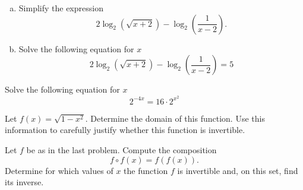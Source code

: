\documentclass[12pt]{amsart}
\begin{document}
\newpage

\begin{thm}[16 Points]\label{ex9}
  \begin{enumerate}[(a)]
  \item
    Simplify the expression 
    $$2\log_2(\sqrt{x + 2}) - \log_2\left(\frac{1}{x - 2}\right).$$
    \vspace{2in}
  \item
    Solve the following equation for $x$
    $$ 2\log_2(\sqrt{x + 2}) - \log_2\left(\frac{1}{x - 2}\right) = 5 $$
    \vspace{1in}
  \end{enumerate}
\end{thm}

\begin{thm}[16 Points]\label{ex7}
  Solve the following equation for $x$
  $$2^{-4x} = 16 \cdot 2^{x^2}$$
\end{thm}

\newpage

\begin{thm}[16 Points]
  Let $f(x) = \sqrt{1 - x^2}$.  Determine the domain of this function.
  Use this information to carefully justify whether this function is invertible.
  \vspace{4in}
\end{thm}

\begin{thm}\label{bonus}
  Let $f$ be as in the last problem.
  Compute the composition $$f \circ f (x) = f(f(x)).$$
  Determine for which values of $x$ the function $f$ is invertible and, on this set, find its inverse.
\end{thm}
\end{document}
